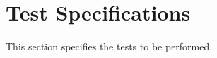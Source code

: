 
\chapter{Test Specifications}
\label{loc:TestSpecifications}


This section specifies the tests to be performed.
\newcommand{\StsTestCaseID}{UndefinedCase}%

\newcommand{\StsTestSpecID}{Test1}%

\renewcommand{\StsTestSpecID}{Test2}%

\renewcommand{\StsTestSpecID}{Test3}%

\DIDINFOON%
